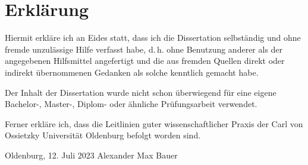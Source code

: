 \documentclass[justified,nobib,symmetric,twoside]{tufte-handout}
\begin{document}
\section*{Erklärung}\label{sec:erklaerung}
Hiermit erkläre ich an Eides statt, dass ich die Dissertation selbständig und ohne fremde unzulässige Hilfe verfasst habe, d.\,h. ohne Benutzung anderer als der angegebenen Hilfsmittel angefertigt und die aus fremden Quellen direkt oder indirekt übernommenen Gedanken als solche kenntlich gemacht habe.

Der Inhalt der Dissertation wurde nicht schon überwiegend für eine eigene Bachelor-, Master-, Diplom- oder ähnliche Prüfungsarbeit verwendet.

Ferner erkläre ich, dass die Leitlinien guter wissenschaftlicher Praxis der Carl von Ossietzky Universität Oldenburg befolgt worden sind.

\vspace{4em}
\noindent Oldenburg, 12. Juli 2023\hspace{3em} Alexander Max Bauer
\end{document}

